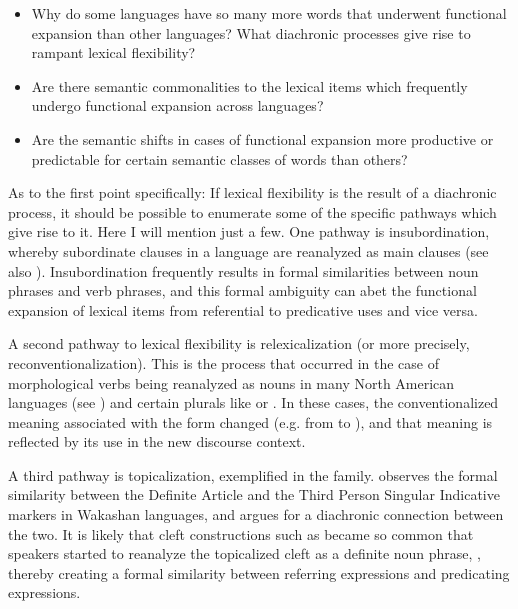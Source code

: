 \begin{itemize}
  \item Why do some languages have so many more words that underwent functional expansion than other languages? What diachronic processes give rise to rampant lexical flexibility?
  \item Are there semantic commonalities to the lexical items which frequently undergo functional expansion across languages?
  \item Are the semantic shifts in cases of functional expansion more productive or predictable for certain semantic classes of words than others?
\end{itemize}

As to the first point specifically: If lexical flexibility is the result of a diachronic process, it should be possible to enumerate some of the specific pathways which give rise to it. Here I will mention just a few. One pathway is insubordination, whereby subordinate clauses in a language are reanalyzed as main clauses \parencites{Evans2007}{Mithun2008}{EvansWatanabe2016} (see also ). Insubordination frequently results in formal similarities between noun phrases and verb phrases, and this formal ambiguity can abet the functional expansion of lexical items from referential to predicative uses and vice versa.

A second pathway to lexical flexibility is relexicalization (or more precisely, reconventionalization). This is the process that occurred in the case of morphological verbs being reanalyzed as nouns in many North American languages (see ) and certain  plurals like  or . In these cases, the conventionalized meaning associated with the form changed (e.g. from   to ), and that meaning is reflected by its use in the new discourse context.

A third pathway is topicalization, exemplified in the  family. \textcite[122, 142]{Jacobsen1979} observes the formal similarity between the Definite Article and the Third Person Singular Indicative markers in Wakashan languages, and argues for a diachronic connection between the two. It is likely that cleft constructions such as  became so common that speakers started to reanalyze the topicalized cleft as a definite noun phrase, , thereby creating a formal similarity between referring expressions and predicating expressions.


